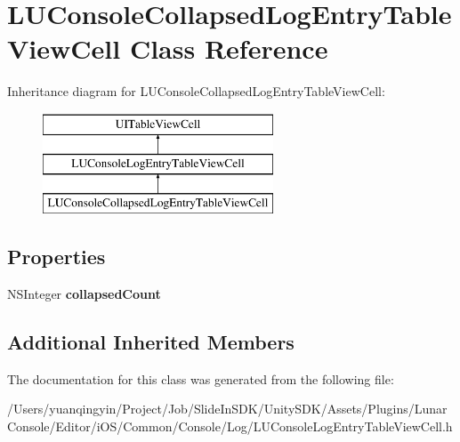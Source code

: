 \hypertarget{interface_l_u_console_collapsed_log_entry_table_view_cell}{}\section{L\+U\+Console\+Collapsed\+Log\+Entry\+Table\+View\+Cell Class Reference}
\label{interface_l_u_console_collapsed_log_entry_table_view_cell}
Inheritance diagram for L\+U\+Console\+Collapsed\+Log\+Entry\+Table\+View\+Cell\+:\begin{figure}[H]
\begin{center}
\leavevmode
\includegraphics[height=3.000000cm]{interface_l_u_console_collapsed_log_entry_table_view_cell}
\end{center}
\end{figure}
\subsection*{Properties}
\begin{DoxyCompactItemize}
\item 
\mbox{\label{interface_l_u_console_collapsed_log_entry_table_view_cell_ae517a5eb7ba73b31194f779bdd22e0c0}} 
N\+S\+Integer {\bfseries collapsed\+Count}
\end{DoxyCompactItemize}
\subsection*{Additional Inherited Members}


The documentation for this class was generated from the following file\+:\begin{DoxyCompactItemize}
\item 
/\+Users/yuanqingyin/\+Project/\+Job/\+Slide\+In\+S\+D\+K/\+Unity\+S\+D\+K/\+Assets/\+Plugins/\+Lunar\+Console/\+Editor/i\+O\+S/\+Common/\+Console/\+Log/L\+U\+Console\+Log\+Entry\+Table\+View\+Cell.\+h\end{DoxyCompactItemize}
